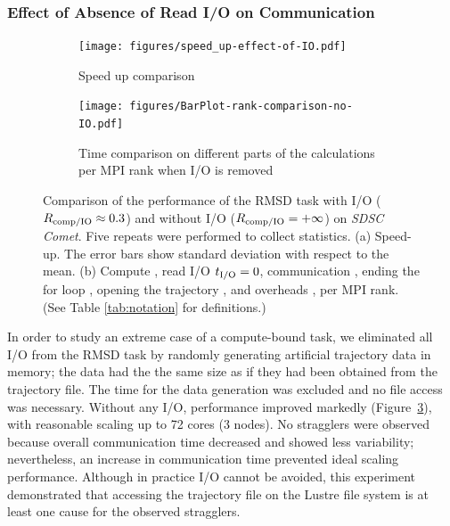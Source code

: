 \subsubsection{Effect of Absence of Read I/O on Communication}

 \begin{figure}[!htb]
   \centering
   \begin{subfigure}{.35\textwidth}
     \texttt{[image: figures/speed\_up-effect-of-IO.pdf]}
     \caption{Speed up comparison}
     \label{fig:MPIspeedup-no-IO}
   \end{subfigure}
   \hfill
   \begin{subfigure}{.45\textwidth}
     \texttt{[image: figures/BarPlot-rank-comparison-no-IO.pdf]}
     \captionsetup{format=hang}
     \caption{Time comparison on different parts of the calculations per MPI rank when I/O is removed}
     \label{fig:MPIranks-no-IO}
   \end{subfigure}
   \caption{Comparison of the performance of the RMSD task with I/O ($R_{\text{comp/IO}} \approx 0.3$) and without I/O ($R_{\text{comp/IO}} = +\infty$) on \emph{SDSC Comet}.
     Five repeats were performed to collect statistics.
     (a) Speed-up. The error bars show standard deviation with respect to the mean.
     (b) Compute \tcomp, read I/O ${t}_{\text{I/O}}=0$, communication \tcomm, ending the for loop ,
     opening the trajectory , and overheads ,  per MPI rank.
     (See Table \ref{tab:notation} for definitions.)}
   \label{fig:MPIwithoutIO}
\end{figure}

In order to study an extreme case of a compute-bound task, we eliminated all I/O from the RMSD task by randomly generating artificial trajectory data in memory; the data had the the same size as if they had been obtained from the trajectory file.
The time for the data generation was excluded and no file access was necessary. 
Without any I/O, performance improved markedly (Figure~\ref{fig:MPIwithoutIO}), with reasonable scaling up to 72 cores (3 nodes).
No stragglers were observed because overall communication time decreased and showed less variability; nevertheless, an increase in communication time prevented ideal scaling performance.
Although in practice I/O cannot be avoided, this experiment demonstrated that accessing the trajectory file on the Lustre file system is at least one cause for the observed stragglers.


